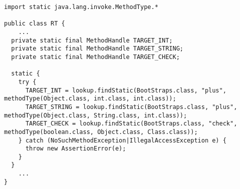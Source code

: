 {\tiny \begin{verbatim}
import static java.lang.invoke.MethodType.*

public class RT {
    ...
  private static final MethodHandle TARGET_INT;
  private static final MethodHandle TARGET_STRING;
  private static final MethodHandle TARGET_CHECK;

  static {
    try {
      TARGET_INT = lookup.findStatic(BootStraps.class, "plus", methodType(Object.class, int.class, int.class));
      TARGET_STRING = lookup.findStatic(BootStraps.class, "plus", methodType(Object.class, String.class, int.class));
      TARGET_CHECK = lookup.findStatic(BootStraps.class, "check", methodType(boolean.class, Object.class, Class.class));
    } catch (NoSuchMethodException|IllegalAccessException e) {
      throw new AssertionError(e);
    }
  }
    ...
}
\end{verbatim} }